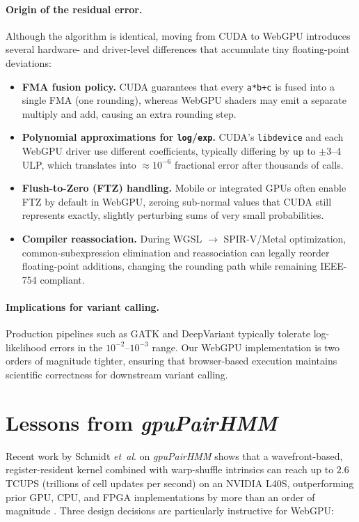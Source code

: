 \documentclass[PhD]{PHlab-thesis}
\begin{document}
\paragraph{Origin of the residual error.}
Although the algorithm is identical, moving from CUDA to WebGPU introduces several hardware- and driver-level differences that accumulate tiny floating-point deviations:
\begin{itemize}
  \item \textbf{FMA fusion policy.} CUDA guarantees that every \texttt{a*b+c} is fused into a single FMA (one rounding), whereas WebGPU shaders may emit a separate multiply and add, causing an extra rounding step.
  \item \textbf{Polynomial approximations for \texttt{log}/\texttt{exp}.} CUDA’s \texttt{libdevice} and each WebGPU driver use different coefficients, typically differing by up to $\pm$3–4 ULP, which translates into $\approx10^{-6}$ fractional error after thousands of calls.
  \item \textbf{Flush-to-Zero (FTZ) handling.} Mobile or integrated GPUs often enable FTZ by default in WebGPU, zeroing sub-normal values that CUDA still represents exactly, slightly perturbing sums of very small probabilities.
  \item \textbf{Compiler reassociation.} During WGSL $\rightarrow$ SPIR-V/Metal optimization, common-subexpression elimination and reassociation can legally reorder floating-point additions, changing the rounding path while remaining IEEE-754 compliant.
\end{itemize}

\paragraph{Implications for variant calling.}
Production pipelines such as GATK and DeepVariant typically tolerate log-likelihood errors in the $10^{-2}$–$10^{-3}$ range. Our WebGPU implementation is two orders of magnitude tighter, ensuring that browser-based execution maintains scientific correctness for downstream variant calling.


\section{Lessons from \textit{gpuPairHMM}}
Recent work by Schmidt \emph{et~al}. on \textit{gpuPairHMM} shows that a wavefront-based, register-resident kernel combined with warp-shuffle intrinsics can reach up to $2.6$ TCUPS (trillions of cell updates per second) on an NVIDIA L40S, outperforming prior GPU, CPU, and FPGA implementations by more than an order of magnitude \cite{Schmidt2024gpuPairHMM}. Three design decisions are particularly instructive for WebGPU:
\end{document}
